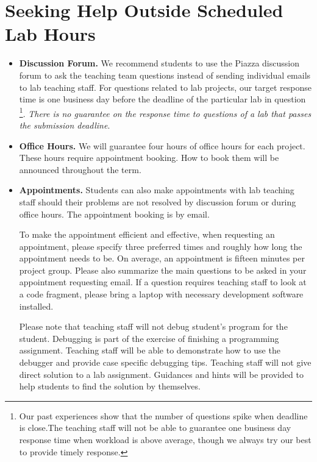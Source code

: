 \section*{Seeking Help Outside Scheduled Lab Hours}
\begin{itemize}
    \item{\bf Discussion Forum.}
      We recommend students to use the Piazza discussion forum to ask the teaching team questions instead of sending individual emails to lab teaching staff. For questions related to lab projects, our target response time is one business day before the deadline of the particular lab in question
      \footnote{Our past experiences show that the number of questions spike when deadline is close.The teaching staff will not be able to guarantee one business day response time when workload is above average, though we always try our best to provide timely response.}. 
    {\em There is no guarantee on the response time to questions of a lab that passes the submission deadline}.
    \item{\bf Office Hours.} 
    We will guarantee four hours of office hours for each project. These hours require appointment booking. How to book them will be announced throughout the term.   
    \item{\bf Appointments.}
    Students can also make appointments with lab teaching staff should their problems are not resolved by discussion forum or during office hours. The appointment booking is by email.
    
    To make the appointment efficient and effective, when requesting an appointment, 
    please specify three preferred times and roughly how long 
    the appointment needs to be. On average, an appointment is fifteen minutes per project group. 
    Please also summarize the main questions to be asked in your appointment requesting email.
    If a question requires teaching staff to look at a code fragment, please bring a laptop with necessary development software installed. 
    
    Please note that teaching staff will not debug student's program for the student. Debugging is part of the exercise of finishing a programming assignment. Teaching staff will be able to demonstrate how to use the debugger and provide case specific debugging tips. Teaching staff will not give direct solution to a lab assignment. Guidances and hints will be provided to help students to find the solution by themselves.
    
\end{itemize}


